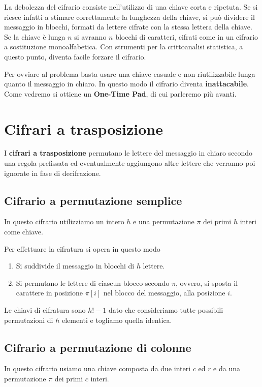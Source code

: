 La debolezza del cifrario consiste nell'utilizzo di una chiave corta e ripetuta. Se si riesce infatti a stimare
correttamente la lunghezza della chiave, si pu\`o dividere il messaggio in blocchi, formati da lettere cifrate con la
stessa lettera della chiave. Se la chiave \`e lunga $n$ si avranno $n$ blocchi di caratteri, cifrati come in un
cifrario a sostituzione monoalfabetica. Con strumenti per la crittoanalisi statistica, a questo punto, diventa facile
forzare il cifrario.

Per ovviare al problema basta usare una chiave casuale e non riutilizzabile lunga quanto il messaggio in chiaro. In
questo modo il cifrario diventa \textbf{inattacabile}. Come vedremo si ottiene un \textbf{One-Time Pad}, di cui
parleremo pi\`u avanti.

\section{Cifrari a trasposizione}\label{trasposizione}
I \textbf{cifrari a trasposizione} permutano le lettere del messaggio in chiaro secondo una regola prefissata ed
eventualmente aggiungono altre lettere che verranno poi ignorate in fase di decifrazione.

\subsection{Cifrario a permutazione semplice}
In questo cifrario utilizziamo un intero $h$ e una permutazione $\pi$ dei primi $h$ interi come chiave.

Per effettuare la cifratura si opera in questo modo
\begin{enumerate}
	\item Si suddivide il messaggio in blocchi di $h$ lettere.
	\item Si permutano le lettere di ciascun blocco secondo $\pi$, ovvero, si sposta il carattere in posizione $\pi[i]$
	      nel blocco del messaggio, alla posizione $i$.
\end{enumerate}
Le chiavi di cifratura sono $h! - 1$ dato che consideriamo tutte possibili permutazioni di $h$ elementi e togliamo
quella identica.

\subsection{Cifrario a permutazione di colonne}
In questo cifrario usiamo una chiave composta da due interi $c$ ed $r$ e da una permutazione $\pi$ dei primi $c$ interi.

